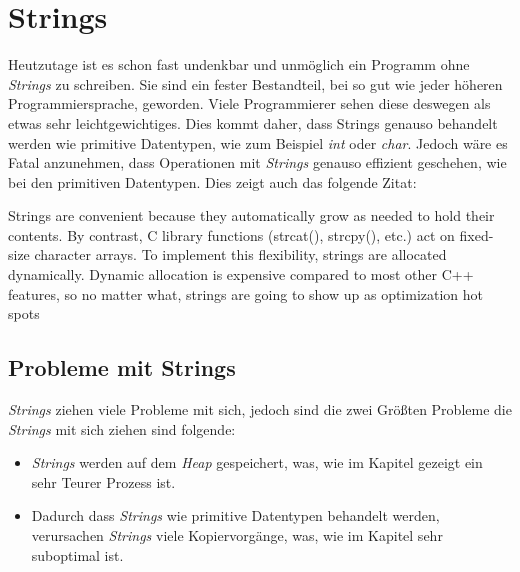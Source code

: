 \section{Strings}\label{sec:strings}
Heutzutage ist es schon fast undenkbar und unmöglich ein Programm ohne \emph{Strings} zu
schreiben. Sie sind ein fester Bestandteil, bei so gut wie jeder höheren Programmiersprache,
geworden. Viele Programmierer sehen diese deswegen als etwas sehr leichtgewichtiges. Dies kommt
daher, dass Strings genauso behandelt werden wie primitive Datentypen, wie zum Beispiel \emph{int}
oder \emph{char}. Jedoch wäre es Fatal anzunehmen, dass Operationen mit \emph{Strings} genauso
effizient
geschehen, wie bei den primitiven Datentypen. Dies zeigt auch das folgende Zitat:

\begin{zitat}
    Strings are convenient because they automatically grow as needed to hold their contents. By
    contrast, C library functions (strcat(), strcpy(), etc.) act on fixed-size character arrays.
    To implement this flexibility, strings are allocated dynamically. Dynamic allocation is
    expensive compared to most other C++ features, so no matter what, strings are going to show
    up as optimization hot spots \cite{OptimizedC++}
\end{zitat}

\subsection{Probleme mit Strings}\label{subsec:stringprobleme}
\emph{Strings} ziehen viele Probleme mit sich, jedoch sind die zwei Größten Probleme die
\emph{Strings} mit sich ziehen sind folgende:

\begin{itemize}
    \item \emph{Strings} werden auf dem \emph{Heap} gespeichert, was, wie im Kapitel
    \emph{} gezeigt ein sehr Teurer Prozess ist.
    \item Dadurch dass \emph{Strings} wie primitive Datentypen behandelt werden, verursachen
    \emph{Strings} viele Kopiervorgänge, was, wie im Kapitel \emph{} sehr
    suboptimal ist.
\end{itemize}

